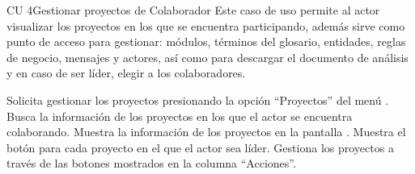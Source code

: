 \newpage 
\begin{UseCase}{CU 4}{Gestionar proyectos de Colaborador}
	{
		Este caso de uso permite al actor visualizar los proyectos en los que se encuentra participando, además sirve como punto de acceso para gestionar: módulos, términos del glosario, entidades, reglas de negocio, mensajes y actores, así como para descargar el documento de análisis y en caso de ser líder, elegir a los colaboradores.
	}
	
	

	


\end{UseCase}
 \begin{UCtrayectoria}
    \UCpaso[\UCactor] Solicita gestionar los proyectos presionando la opción ``Proyectos'' del menú .
    \UCpaso[\UCsist] Busca la información de los proyectos en los que el actor se encuentra colaborando. 
    \UCpaso[\UCsist] Muestra la información de los proyectos en la pantalla .
	\UCpaso[\UCsist] Muestra el botón \btnColaboradores para cada proyecto en el que el actor sea líder.
    \UCpaso[\UCactor] Gestiona los proyectos a través de las botones mostrados en la columna ``Acciones''. \label{cu4:gestiona}
 \end{UCtrayectoria}
 
